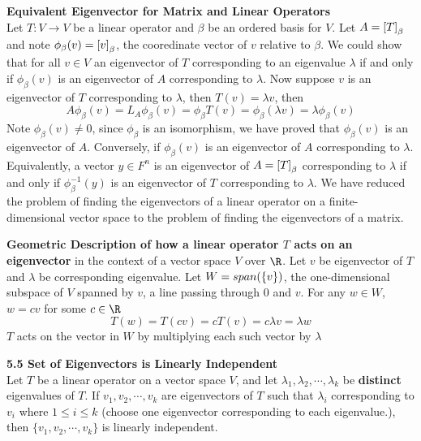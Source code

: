 \documentclass[11pt]{article}
\begin{document}
\begin{proposition*}
    \textbf{Equivalent Eigenvector for Matrix and Linear Operators}\\
    Let $T:V\to V$ be a linear operator and $\beta$ be an ordered basis for $V$. Let $A = \left[ T \right]_{\beta}$ and note $\phi_{\beta}(v) = \left[ v \right]_{\beta}$, the cooredinate vector of $v$ relative to $\beta$. We could show that for all $v\in V$ an eigenvector of $T$ corresponding to an eigenvalue $\lambda$ if and only if $\phi_{\beta}(v)$ is an eigenvector of $A$ corresponding to $\lambda$. Now suppose $v$ is an eigenvector of $T$ corresponding to $\lambda$, then $T(v) = \lambda v$, then 
    \[
        A\phi_{\beta}(v) = L_A\phi_{\beta}(v) = \phi_{\beta}T(v) = \phi_{\beta}(\lambda v) = \lambda \phi_{\beta}(v)    
    \]
    Note $\phi_{\beta}(v)\neq 0$, since $\phi_{\beta}$ is an isomorphism, we have proved that $\phi_{\beta}(v)$ is an eigenvector of $A$. Conversely, if $\phi_{\beta}(v)$ is an eigenvector of $A$ corresponding to $\lambda$. Equivalently, a vector $y\in F^n$ is an eigenvector of $A = \left[ T \right]_{\beta}$ corresponding to $\lambda$ if and only if $\phi_{\beta}^{-1}(y)$ is an eigenvector of $T$ corresponding to $\lambda$. We have reduced the problem of finding the eigenvectors of a linear operator on a finite-dimensional vector space to the problem of finding the eigenvectors of a matrix. 
\end{proposition*}

\begin{defn*}
    \textbf{Geometric Description of how a linear operator $T$ acts on an eigenvector} in the context of a vector space $V$ over $\R$. Let $v$ be eigenvector of $T$ and $\lambda$ be corresponding eigenvalue. Let $W = span(\{v\})$, the one-dimensional subspace of $V$ spanned by $v$, a line passing through 0 and $v$. For any $w\in W$, $w = cv$ for some $c\in \R$
    \[
        T(w) = T(cv) = cT(v) = c\lambda v = \lambda w
    \]
    $T$ acts on the vector in $W$ by multiplying each such vector by $\lambda$
\end{defn*}



\begin{theorem*}
    \textbf{5.5 Set of Eigenvectors is Linearly Independent} \\
    Let $T$ be a linear operator on a vector space $V$, and let $\lambda_1, \lambda_2, \cdots, \lambda_k$ be \textbf{distinct} eigenvalues of $T$. If $v_1, v_2, \cdots,  v_k$ are eigenvectors of $T$ such that $\lambda_i$ corresponding to $v_i$ where $1\leq i \leq k$ (choose one eigenvector corresponding to each eigenvalue.), then $\{v_1,v_2,\cdots, v_k\}$ is linearly independent. 
\end{theorem*}
\end{document}
